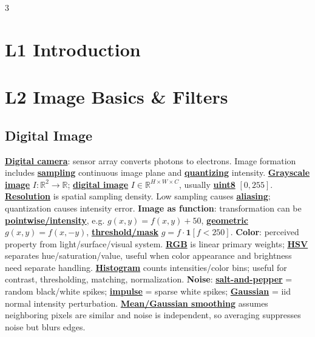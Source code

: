 \documentclass{article}
\numberwithin{equation}{subsection}
\newcommand{\key}[1]{\textbf{#1}}
\newcommand{\lowterm}[1]{\textbf{\underline{#1}}}
\newcommand{\R}{\mathbb{R}}
\begin{document}
\tiny
\begin{multicols*}{3}
\section{L1 Introduction}

\section{L2 Image Basics \& Filters}
\subsection{Digital Image}
\lowterm{Digital camera}: sensor array converts photons to electrons. Image formation includes \lowterm{sampling} continuous image plane and \lowterm{quantizing} intensity. \lowterm{Grayscale image} $I:\R^2\to\R$; \lowterm{digital image} $I\in\R^{H\times W\times C}$, usually \lowterm{uint8} $[0,255]$. \lowterm{Resolution} is spatial sampling density. Low sampling causes \lowterm{aliasing}; quantization causes intensity error.
\key{Image as function}: transformation can be \lowterm{pointwise/intensity}, e.g. $g(x,y)=f(x,y)+50$, \lowterm{geometric} $g(x,y)=f(x,-y)$, \lowterm{threshold/mask} $g=f\cdot\mathbf 1[f<250]$.
\key{Color}: perceived property from light/surface/visual system. \lowterm{RGB} is linear primary weights; \lowterm{HSV} separates hue/saturation/value, useful when color appearance and brightness need separate handling. \lowterm{Histogram} counts intensities/color bins; useful for contrast, thresholding, matching, normalization.
\key{Noise}: \lowterm{salt-and-pepper} = random black/white spikes; \lowterm{impulse} = sparse white spikes; \lowterm{Gaussian} = iid normal intensity perturbation. \lowterm{Mean/Gaussian smoothing} assumes neighboring pixels are similar and noise is independent, so averaging suppresses noise but blurs edges.


\end{multicols*}
\end{document}
